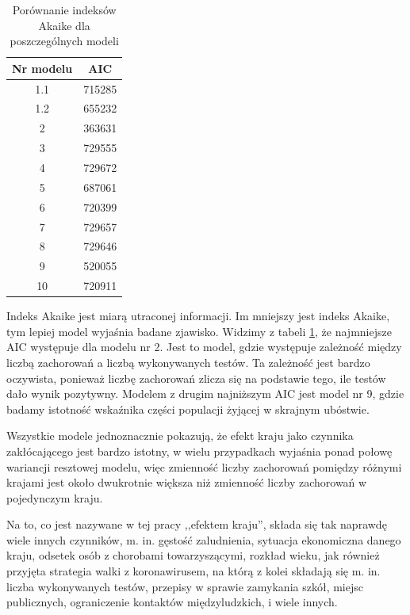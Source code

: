 \documentclass[12pt]{mwbk}
\theoremstyle{plain}
\theoremstyle{definition}
\theoremstyle{remark}
\newcommand\zrodlo[1]{\par\vspace{-3mm}{\small\textit{Źródło: }#1 }}
\begin{document}
\begin{table}
	\centering
	\begin{tabular}{|c|c|}
		\hline 
		Nr modelu&   AIC \\ \hline
		1.1 &  715285\\ \hline
		1.2&  655232 \\ \hline
		2 &  363631  \\ \hline
		3 &   729555  \\ \hline
		4 &   729672  \\ \hline
		5 &   687061  \\ \hline
		6 &   720399  \\ \hline
		7 &   729657  \\ \hline
		8 &   729646 \\ \hline
		9 &   520055 \\ \hline
		10&   720911 \\ \hline
	\end{tabular}
\caption{Porównanie indeksów Akaike dla poszczególnych modeli}
\label{tab:akaike}
\zrodlo{Opracowanie własne}
\end{table}

Indeks Akaike jest miarą utraconej informacji. Im mniejszy jest indeks Akaike, tym lepiej model wyjaśnia badane zjawisko. Widzimy z tabeli \ref{tab:akaike}, że najmniejsze AIC występuje dla modelu nr 2. Jest to model, gdzie występuje zależność między liczbą zachorowań a liczbą wykonywanych testów. Ta zależność jest bardzo oczywista, ponieważ liczbę zachorowań zlicza się na podstawie tego, ile testów dało wynik pozytywny. Modelem z drugim najniższym AIC jest model nr 9, gdzie badamy istotność wskaźnika części populacji żyjącej w skrajnym ubóstwie.



Wszystkie modele jednoznacznie pokazują, że efekt kraju jako czynnika zakłócającego jest bardzo istotny, w wielu przypadkach wyjaśnia ponad połowę wariancji resztowej modelu, więc zmienność liczby zachorowań pomiędzy różnymi krajami jest około dwukrotnie większa niż zmienność liczby zachorowań w pojedynczym kraju.

Na to, co jest nazywane w tej pracy ,,efektem kraju'', składa się tak naprawdę wiele innych czynników, m. in. gęstość zaludnienia, sytuacja ekonomiczna danego kraju, odsetek osób z chorobami towarzyszącymi, rozkład wieku, jak również przyjęta strategia walki z koronawirusem, na którą z kolei składają się m. in. liczba wykonywanych testów, przepisy w sprawie zamykania szkół, miejsc publicznych, ograniczenie kontaktów międzyludzkich, i wiele innych.
\end{document}
